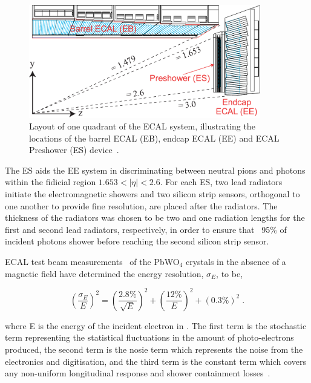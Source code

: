 \begin{figure}[htb]
\begin{center}
\vspace*{4mm}\includegraphics[width=0.9\textwidth]{figs/cms/ECAL_Transverse_section.pdf}
\caption{Layout of one quadrant of the ECAL system, illustrating the locations of the barrel ECAL (EB), endcap ECAL (EE) and ECAL Preshower (ES) device~\cite{Bayatian:2006nff}.}
\label{fig:ecal}
\end{center}
\end{figure}

The ES aids the EE system in discriminating between neutral pions and photons within the fidicial region $1.653 < |\eta| < 2.6$.
For each ES, two lead radiators initiate the electromagnetic showers and two silicon strip sensors, orthogonal to one another to provide fine resolution, are placed after the radiators.
The thickness of the radiators was chosen to be two and one radiation lengths for the first and second lead radiators, respectively, in order to ensure that ~95\% of incident photons shower before reaching the second silicon strip sensor.

ECAL test beam measurements~\cite{Adzic:2007mi} of the PbWO$_{4}$ crystals in the absence of a magnetic field have determined the energy resolution, $\sigma_{E}$, to be,

\begin{equation}
(\frac{\sigma_{E}}{E})^{2} = (\frac{2.8\%}{\sqrt{E}})^{2} + (\frac{12\%}{E})^{2} + (0.3\%)^{2} \;.
\label{eq:ecalResolution}
\end{equation}

where E is the energy of the incident electron in \GeV. 
The first term is the stochastic term representing the statistical fluctuations in the amount of photo-electrons produced, the second term is the nosie term which represents the noise from the electronics and digitisation, and the third term is the constant term which covers any non-uniform longitudinal response and shower containment losses~\cite{Adzic:2007mi}.

